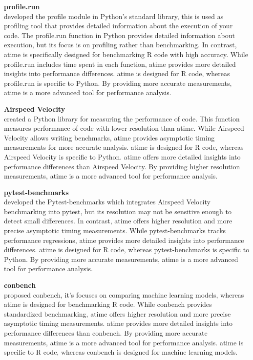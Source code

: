 \textbf{profile.run} \\
\citet{profile} developed the profile module in Python's standard library, this is used as profiling tool that provides detailed information about the execution of your code. The profile.run function in Python provides detailed information about execution, but its focus is on profiling rather than benchmarking. In contrast, atime is specifically designed for benchmarking R code with high accuracy. While profile.run includes time spent in each function, atime provides more detailed insights into performance differences. atime is designed for R code, whereas profile.run is specific to Python. By providing more accurate measurements, atime is a more advanced tool for performance analysis.
\vspace{0.1in}

\textbf{Airspeed Velocity} \\
\citet{airspeed_velocity} created a Python library for measuring the performance of code. This function measures performance of code with lower resolution than atime. While Airspeed Velocity allows writing benchmarks, atime provides asymptotic timing measurements for more accurate analysis. atime is designed for R code, whereas Airspeed Velocity is specific to Python. atime offers more detailed insights into performance differences than Airspeed Velocity. By providing higher resolution measurements, atime is a more advanced tool for performance analysis.
\vspace{0.1in}

\textbf{pytest-benchmarks} \\
\citet{pytest_benchmark} developed the Pytest-benchmarks which integrates Airspeed Velocity benchmarking into pytest, but its resolution may not be sensitive enough to detect small differences. In contrast, atime offers higher resolution and more precise asymptotic timing measurements. While pytest-benchmarks tracks performance regressions, atime provides more detailed insights into performance differences. atime is designed for R code, whereas pytest-benchmarks is specific to Python. By providing more accurate measurements, atime is a more advanced tool for performance analysis.
\vspace{0.1in}

\textbf{conbench} \\
\citet{conbench} proposed conbench, it's focuses on comparing machine learning models, whereas atime is designed for benchmarking R code. While conbench provides standardized benchmarking, atime offers higher resolution and more precise asymptotic timing measurements. atime provides more detailed insights into performance differences than conbench. By providing more accurate measurements, atime is a more advanced tool for performance analysis. atime is specific to R code, whereas conbench is designed for machine learning models.
\vspace{0.1in}

